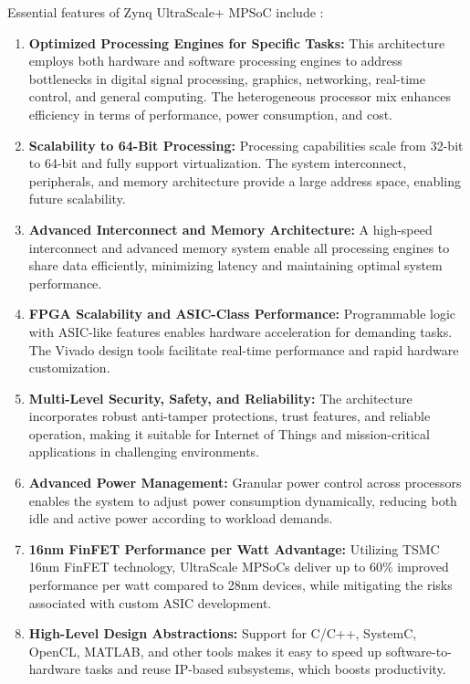 Essential features of Zynq UltraScale+ \acs{MPSoC} include \cite{XilinxUltraScaleMPSoCArchitecture}:
\begin{enumerate}
	\item \textbf{ Optimized Processing Engines for Specific Tasks:}
	This architecture employs both hardware and software processing engines to address bottlenecks in digital signal processing, graphics, networking, real-time control, and general computing. The heterogeneous processor mix enhances efficiency in terms of performance, power consumption, and cost.
	\item \textbf{ Scalability to 64-Bit Processing:}
	Processing capabilities scale from 32-bit to 64-bit and fully support virtualization. The system interconnect, peripherals, and memory architecture provide a large address space, enabling future scalability.
	\item \textbf{Advanced Interconnect and Memory Architecture:}
	A high-speed interconnect and advanced memory system enable all processing engines to share data efficiently, minimizing latency and maintaining optimal system performance.
	\item \textbf{ \acs{FPGA} Scalability and ASIC-Class Performance:}
	Programmable logic with ASIC-like features enables hardware acceleration for demanding tasks. The Vivado design tools facilitate real-time performance and rapid hardware customization.
	\item \textbf{ Multi-Level Security, Safety, and Reliability:}
	The architecture incorporates robust anti-tamper protections, trust features, and reliable operation, making it suitable for Internet of Things and mission-critical applications in challenging environments.
	\item \textbf{ Advanced Power Management:}
	Granular power control across processors enables the system to adjust power consumption dynamically, reducing both idle and active power according to workload demands.
	\item \textbf{ 16nm FinFET Performance per Watt Advantage:}
	Utilizing TSMC 16nm FinFET technology, UltraScale \acs{MPSoC}s deliver up to 60\% improved performance per watt compared to 28nm devices, while mitigating the risks associated with custom ASIC development.
	\item \textbf{  High-Level Design Abstractions:}
	Support for C/C++, SystemC, OpenCL, MATLAB, and other tools makes it easy to speed up software-to-hardware tasks and reuse \acs{IP}-based subsystems, which boosts productivity.
\end{enumerate}

